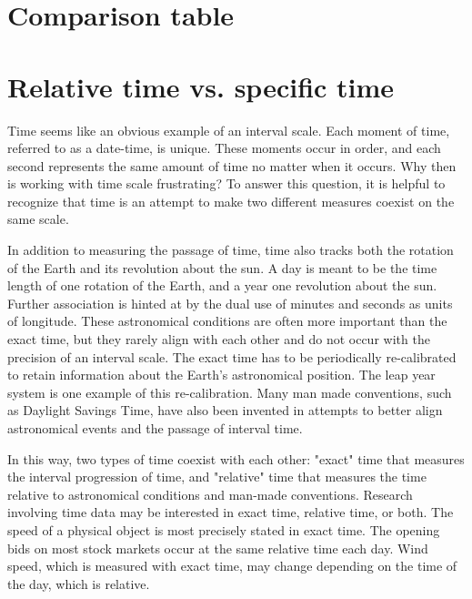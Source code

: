 \documentclass[article]{jss}
\begin{document}
\section{Comparison table}


\section{Relative time vs. specific time}

Time seems like an obvious example of an interval scale. Each moment of time, referred to as a date-time, is unique.  These moments occur in order, and each second represents the same amount of time no matter when it occurs.  Why then is working with time scale frustrating? To answer this question, it is helpful to recognize that time is an attempt to make two different measures coexist on the same scale. 

In addition to measuring the passage of time, time also tracks both the rotation of the Earth and its revolution about the sun.  A day is meant to be the time length of one rotation of the Earth, and a year one revolution about the sun.  Further association is hinted at by the dual use of minutes and seconds as units of longitude.  These astronomical conditions are often more important than the exact time, but they rarely align with each other and do not occur with the precision of an interval scale.  The exact time has to be periodically re-calibrated to retain information about the Earth's astronomical position.  The leap year system is one example of this re-calibration. Many man made conventions, such as Daylight Savings Time, have also been invented in attempts to better align astronomical events and the passage of interval time.

In this way, two types of time coexist with each other: "exact" time that measures the interval progression of time, and "relative" time that measures the time relative to astronomical conditions and man-made conventions. Research involving time data may be interested in exact time, relative time, or both. The speed of a physical object is most precisely stated in exact time. The opening bids on most stock markets occur at the same relative time each day.  Wind speed, which is measured with exact time, may change depending on the time of the day, which is relative. 
\end{document}
